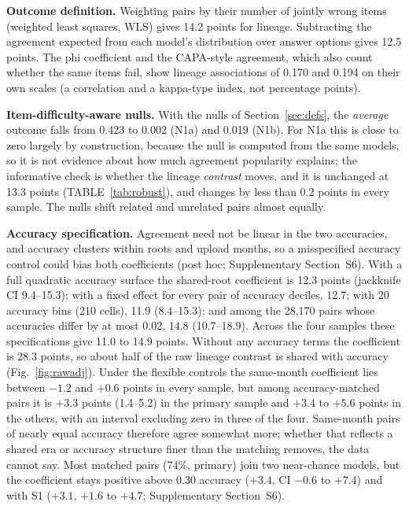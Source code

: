 \documentclass{ieeeaccess}
\theoremstyle{definition}
\theoremstyle{plain}
\begin{document}
\textbf{Outcome definition.} Weighting pairs by their number of jointly wrong items (weighted least squares, WLS) gives 14.2 points for lineage. Subtracting the agreement expected from each model's distribution over answer options gives 12.5 points. The phi coefficient and the CAPA-style agreement, which also count whether the same items fail, show lineage associations of 0.170 and 0.194 on their own scales (a correlation and a kappa-type index, not percentage points).

\textbf{Item-difficulty-aware nulls.} With the nulls of Section~\ref{sec:defs}, the \emph{average} outcome falls from 0.423 to 0.002 (N1a) and 0.019 (N1b). For N1a this is close to zero largely by construction, because the null is computed from the same models, so it is not evidence about how much agreement popularity explains; the informative check is whether the lineage \emph{contrast} moves, and it is unchanged at 13.3 points (TABLE~\ref{tab:robust}), and changes by less than 0.2 points in every sample. The nulls shift related and unrelated pairs almost equally.

\textbf{Accuracy specification.} Agreement need not be linear in the two accuracies, and accuracy clusters within roots and upload months, so a misspecified accuracy control could bias both coefficients (post hoc; Supplementary Section~S6). With a full quadratic accuracy surface the shared-root coefficient is 12.3 points (jackknife CI 9.4--15.3); with a fixed effect for every pair of accuracy deciles, 12.7; with 20 accuracy bins (210 cells), 11.9 (8.4--15.3); and among the 28{,}170 pairs whose accuracies differ by at most 0.02, 14.8 (10.7--18.9). Across the four samples these specifications give 11.0 to 14.9 points. Without any accuracy terms the coefficient is 28.3 points, so about half of the raw lineage contrast is shared with accuracy (Fig.~\ref{fig:rawadj}). Under the flexible controls the same-month coefficient lies between $-1.2$ and $+0.6$ points in every sample, but among accuracy-matched pairs it is $+3.3$ points (1.4--5.2) in the primary sample and $+3.4$ to $+5.6$ points in the others, with an interval excluding zero in three of the four. Same-month pairs of nearly equal accuracy therefore agree somewhat more; whether that reflects a shared era or accuracy structure finer than the matching removes, the data cannot say. Most matched pairs (74\%, primary) join two near-chance models, but the coefficient stays positive above 0.30 accuracy ($+3.4$, CI $-0.6$ to $+7.4$) and with S1 ($+3.1$, $+1.6$ to $+4.7$; Supplementary Section~S6).
\end{document}
